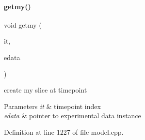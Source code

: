 \paragraph{\texorpdfstring{getmy()}{getmy()}}
{\footnotesize\ttfamily void getmy (\begin{DoxyParamCaption}\item[{const int}]{it,  }\item[{const \mbox{\hyperlink{classamici_1_1_exp_data}{Exp\+Data}} $\ast$}]{edata }\end{DoxyParamCaption})\hspace{0.3cm}{\ttfamily [protected]}}

create my slice at timepoint 
\begin{DoxyParams}{Parameters}
{\em it} & timepoint index \\
\hline
{\em edata} & pointer to experimental data instance \\
\hline
\end{DoxyParams}


Definition at line 1227 of file model.\+cpp.

